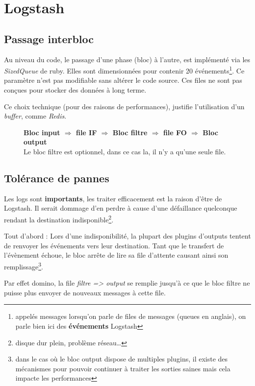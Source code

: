 \section{Logstash}
\subsection{Passage interbloc}
\label{subsec:passageinterbloc}
Au niveau du code, le passage d'une phase (bloc) à l'autre, est implémenté via les \emph{SizedQueue} 
de ruby. Elles sont dimensionnées pour contenir 20 événements\footnote{appelés messages 
lorsqu'on parle de files de messages (queues en anglais), on parle bien ici 
des \textbf{événements} Logstash}. Ce paramètre n'est pas modifiable sans altérer 
le code source. Ces files ne sont pas conçues pour stocker des données à long terme. 

Ce choix technique (pour des raisons de performances), justifie l'utilisation d'un 
\textit{buffer}, comme \emph{Redis}.

\begin{figure}[H]
\center
\textbf{Bloc input $\Rightarrow$ file IF $\Rightarrow$ Bloc filtre $\Rightarrow$  file FO $\Rightarrow$ Bloc output}\\
{\footnotesize Le bloc filtre est optionnel, dans ce cas la, il n'y a qu'une seule file.}
\end{figure}


\subsection{Tolérance de pannes}
Les logs sont \textbf{importants}, les traiter efficacement est la raison d'être 
de Logstash. Il serait dommage d'en perdre à cause d'une défaillance quelconque 
rendant la destination indisponible\footnote{disque dur plein, problème réseau\ldots}.

Tout d'abord : Lors d'une indisponibilité, la plupart des plugins d'outputs tentent 
de renvoyer les événements vers leur destination. 
Tant que le transfert de l'évènement échoue, le bloc arrête de lire sa file d'attente
causant ainsi son remplissage\footnote{dans le cas où le bloc output dispose de  
multiples plugins, il existe des mécanismes pour pouvoir continuer à traiter les 
sorties saines mais cela impacte les performances}.

Par effet domino, la file \textit{filtre => output} se remplie jusqu'à ce que le 
bloc filtre ne puisse plus envoyer de nouveaux messages à cette file. 

